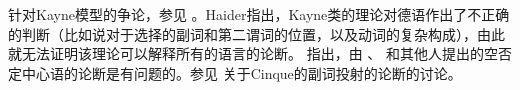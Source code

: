 针对Kayne模型的争论，参见 。Haider指出，Kayne类的理论对德语作出了不正确的判断（比如说对于选择的副词和第二谓词的位置，以及动词的复杂构成），由此就无法证明该理论可以解释所有的语言的论断。 \citet[第4节]{Haider97a}指出，由 \citet{Pollock89a-u}、 \citet{Haegeman95a-u}和其他人提出的空否定中心语的论断是有问题的。参见 关于Cinque的副词投射的论断的讨论。

